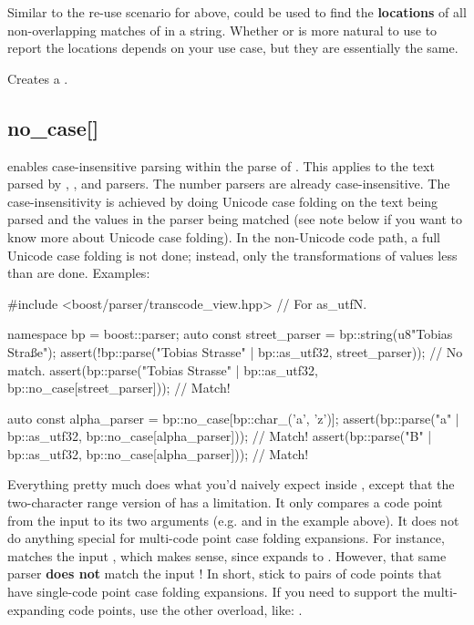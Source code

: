 \documentclass{MyBook}
\begin{document}
Similar to the re-use scenario for  above,  could be used to find the \textbf{locations} of all non-overlapping matches of  in a string. Whether  or  is more natural to use to report the locations depends on your use case, but they are essentially the same.

Creates a .

\subsection{no\_case{[}{]}}

 enables case-insensitive parsing within the parse of . This applies to the text parsed by , , and  parsers. The number parsers are already case-insensitive. The case-insensitivity is achieved by doing Unicode case folding on the text being parsed and the values in the parser being matched (see note below if you want to know more about Unicode case folding). In the non-Unicode code path, a full Unicode case folding is not done; instead, only the transformations of values less than  are done. Examples:

\begin{code}
#include <boost/parser/transcode_view.hpp> // For as_utfN.

namespace bp = boost::parser;
auto const street_parser = bp::string(u8"Tobias Straße");
assert(!bp::parse("Tobias Strasse" | bp::as_utf32, street_parser));             // No match.
assert(bp::parse("Tobias Strasse" | bp::as_utf32, bp::no_case[street_parser])); // Match!

auto const alpha_parser = bp::no_case[bp::char_('a', 'z')];
assert(bp::parse("a" | bp::as_utf32, bp::no_case[alpha_parser])); // Match!
assert(bp::parse("B" | bp::as_utf32, bp::no_case[alpha_parser])); // Match!
\end{code}

Everything pretty much does what you'd naively expect inside , except that the two-character range version of  has a limitation. It only compares a code point from the input to its two arguments (e.g.  and  in the example above). It does not do anything special for multi-code point case folding expansions. For instance,  matches the input , which makes sense, since  expands to . However, that same parser \textbf{does not} match the input ! In short, stick to pairs of code points that have single-code point case folding expansions. If you need to support the multi-expanding code points, use the other overload, like: .
\end{document}
